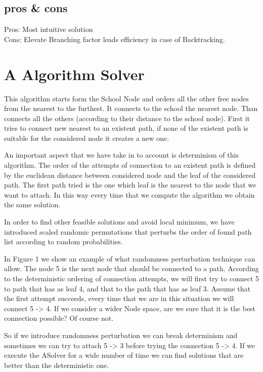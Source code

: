\documentclass[english]{report}
\begin{document}
\subsection*{pros \& cons}
Pros: Most intuitive solution\\
Cons: Elevate Branching factor leads efficiency in case of Backtracking.

\section{A Algorithm Solver}
This algorithm starts form the School Node and orders all the other free nodes from the nearest to the furthest. It connects to the school the nearest node. Than connects all the others (according to their distance to the school node).
First it tries to connect new nearest to an existent path, if none of the existent path is suitable for the considered node it creates a new one.
\par An important aspect that we have take in to account is determinism of this algorithm. The order of the attempts of connection to an existent path is defined by the euclidean distance between considered node and the leaf of the considered path. The first path tried is the one which leaf is the nearest to the node that we want to attach. In this way every time that we compute the algorithm we obtain the same solution.
\par In order to find other feasible solutions and avoid local minimum, we have introduced scaled randomic permutations that perturbs the order of found path list according to random probabilities. 
\par In Figure 1 we show an example of what randomness perturbation technique can allow. The node 5 is the next node that should be connected to a path. According to the deterministic ordering of connection attempts, we will first try to connect 5 to path that has as leaf 4, and that to the path that has as leaf 3. Assume that the first attempt succeeds, every time that we are in this situation we will connect 5 -> 4. If we consider a wider Node space, are we sure that it is the best connection possible? Of course not.
\par So if we introduce randomness perturbation we can break determinism and sometimes we can try to attach 5  -> 3 before trying the connection 5 -> 4. If we execute the ASolver for a wide number of time we can find solutions that are better than the deterministic one.
\end{document}
